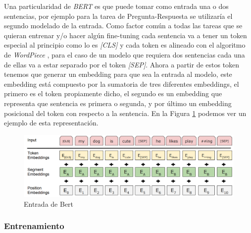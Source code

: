 Una particularidad de \textit{BERT} es que puede tomar como entrada una o dos sentencias, por ejemplo para la tarea de Pregunta-Respuesta se utilizaría el segundo modelado de la entrada. Como factor común a todas las tareas que se quieran entrenar y/o hacer algún fine-tuning cada sentencia va a tener un token especial al principio como lo es \textit{[CLS]} y cada token es alineado con el algoritmo de \textit{WordPiece} \cite{45610}, para el caso de un modelo que requiera dos sentencias cada una de ellas va a estar separado por el token \textit{[SEP]}. Ahora a partir de estos token tenemos que generar un embedding para que sea la entrada al modelo, este embedding está compuesto por la sumatoria de tres diferentes embeddings, el primero es el token propiamente dicho, el segundo es un embedding que representa que sentencia es primera o segunda, y por último un embedding posicional del token con respecto a la sentencia. En la Figura \ref{fig:bert_input} podemos ver un ejemplo de esta representación.

\begin{figure}
\begin{center}
    \includegraphics[width=\textwidth]{images/image201.png}
    \caption{Entrada de Bert}
    \label{fig:bert_input}
\end{center}
\end{figure}

\subsubsection{Entrenamiento}

